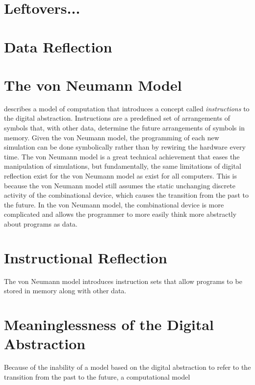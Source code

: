 \section{Leftovers...}

\section{Data Reflection}



\section{The von Neumann Model}

\cite{von_neumann:1945} describes a model of computation that
introduces a concept called \emph{instructions} to the digital
abstraction.  Instructions are a predefined set of arrangements of
symbols that, with other data, determine the future arrangements of
symbols in memory.  Given the von Neumann model, the programming of
each new simulation can be done symbolically rather than by rewiring
the hardware every time.  The von Neumann model is a great technical
achievement that eases the manipulation of simulations, but
fundamentally, the same limitations of digital reflection exist for
the von Neumann model as exist for all computers.  This is because the
von Neumann model still assumes the static unchanging discrete
activity of the combinational device, which causes the transition from
the past to the future.  In the von Neumann model, the combinational
device is more complicated and allows the programmer to more easily
think more abstractly about programs as data.

\section{Instructional Reflection}

The von Neumann model introduces instruction sets that allow programs
to be stored in memory along with other data.

\section{Meaninglessness of the Digital Abstraction}



Because of the inability of a model based on the digital abstraction
to refer to the transition from the past to the future, a
computational model

